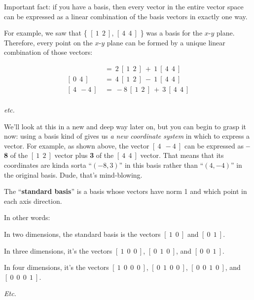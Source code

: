 Important fact: if you have a basis, then every vector in the entire vector
space can be expressed as a linear combination of the basis vectors in exactly
one way.

For example, we saw that \{ $[\ 1\ \ 2\ ]$, $[\ 4 \ \ 4\ ]$ \} was a basis for
the $x$-$y$ plane. Therefore, every point on the $x$-$y$ plane can be formed by
a unique linear combination of those vectors:

\begin{align*}
[\ 6 \ \ 8\ ]\ &=\ 2\ [\ 1 \ \ 2\ ] \ + \ 1\ [\ 4 \ \ 4\ ] \\
[\ 0 \ \ 4\ ]\ &=\ 4\ [\ 1 \ \ 2\ ] \ - \ 1\ [\ 4 \ \ 4\ ] \\
[\ 4 \ \ -4\ ]\ &=\ -8\ [\ 1 \ \ 2\ ] \ + \ 3\ [\ 4 \ \ 4\ ] \\
\end{align*}
\vspace{-.7in}
\begin{center}
\textit{etc.}
\end{center}

We'll look at this in a new and deep way later on, but you can begin to grasp
it now: using a basis kind of gives us \textit{a new coordinate system} in
which to express a vector. For example, as shown above, the vector $[\ 4\ \ -4\
]$ can be expressed as \textbf{--8} of the $[\ 1\ \ 2\ ]$ vector plus
\textbf{3} of the $[\ 4\ \ 4\ ]$ vector. That means that its coordinates are
kinda sorta ``$(-8,3)$'' in this basis rather than ``$(4,-4)$'' in the original
basis. Dude, that's mind-blowing.

\begin{framed}
The ``\textbf{standard basis}'' is a basis whose vectors have norm 1 and which
point in each axis direction.
\end{framed}

In other words:

\begin{compactitem}

\item In two dimensions, the standard basis is the vectors $[\ 1\ \ 0\ ]$ and
$[\ 0\ \ 1\ ]$.

\item In three dimensions, it's the vectors $[\ 1\ \ 0\ \ 0\ ]$, $[\ 0\ \ 1\ \
0\ ]$, and $[\ 0\ \ 0\ \ 1\ ]$.

\item In four dimensions, it's the vectors $[\ 1\ \ 0\ \ 0\ \ 0\ ]$, $[\ 0\ \ 1\ \
0\ \ 0\ ]$, $[\ 0\ \ 0\ \ 1\ \ 0\ ]$, and $[\ 0\ \ 0\ \ 0\ \ 1\ ]$.

\item \textit{Etc.}
\end{compactitem}


